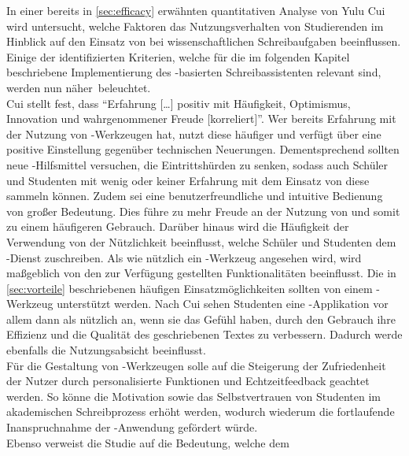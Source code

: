 \documentclass[../main.tex]{subfiles}
\begin{document}
In einer bereits in \autoref{sec:efficacy} erwähnten quantitativen Analyse von Yulu Cui wird untersucht, welche Faktoren das Nutzungsverhalten von Studierenden im Hinblick auf den 
Einsatz von   bei wissenschaftlichen Schreibaufgaben beeinflussen\cite{influencingUsingAi}. Einige der identifizierten Kriterien, welche für die im folgenden Kapitel 
beschriebene Implementierung des -basierten Schreibassistenten relevant sind, werden nun \mbox{näher beleuchtet.} \\ 
Cui stellt fest, dass "`Erfahrung […] positiv mit Häufigkeit, Optimismus, Innovation und wahrgenommener Freude [korreliert]"'\cite[6]{influencingUsingAi}. Wer bereits 
Erfahrung mit der Nutzung von -Werkzeugen hat, nutzt diese häufiger und verfügt über eine positive Einstellung gegenüber technischen Neuerungen. Dementsprechend 
sollten neue -Hilfsmittel versuchen, die Eintrittshürden zu senken, sodass auch Schüler und Studenten mit wenig oder keiner Erfahrung mit dem Einsatz von  diese 
sammeln können. Zudem sei eine benutzerfreundliche und intuitive Bedienung von großer Bedeutung\cite[6]{influencingUsingAi}. Dies führe zu mehr Freude an der Nutzung 
von  und somit zu einem häufigeren Gebrauch. Darüber hinaus wird die Häufigkeit der Verwendung von der Nützlichkeit beeinflusst, welche Schüler und Studenten 
dem -Dienst zuschreiben. Als wie nützlich ein -Werkzeug angesehen wird, wird maßgeblich von den zur Verfügung gestellten Funktionalitäten beeinflusst. Die in 
\autoref{sec:vorteile} beschriebenen häufigen Einsatzmöglichkeiten sollten von einem -Werkzeug unterstützt werden. Nach Cui sehen Studenten eine -Applikation vor allem dann 
als nützlich an, wenn sie das Gefühl haben, durch den Gebrauch ihre Effizienz und die Qualität des geschriebenen Textes zu verbessern. Dadurch werde ebenfalls die 
Nutzungsabsicht beeinflusst\cite[7]{influencingUsingAi}. \\
Für die Gestaltung von -Werkzeugen solle auf die Steigerung der Zufriedenheit der Nutzer durch personalisierte Funktionen und Echtzeitfeedback geachtet 
werden\cite[10]{influencingUsingAi}. So könne die Motivation sowie das Selbstvertrauen von Studenten im akademischen Schreibprozess erhöht werden, wodurch 
wiederum die fortlaufende Inanspruchnahme der -Anwendung gefördert würde\cite[10]{influencingUsingAi}. \\Ebenso verweist die Studie auf die Bedeutung, welche dem 
\end{document}

